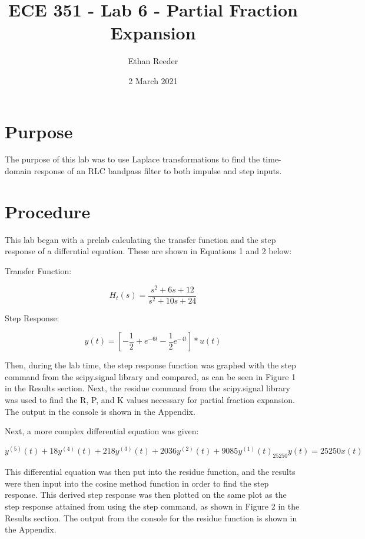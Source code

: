 \documentclass[12pt]{article}
\title{ECE 351 - Lab 6 - Partial Fraction Expansion}
\author{Ethan Reeder}
\date{2 March 2021}
\begin{document}
\lstset{language=Python}

\maketitle

\newpage

\tableofcontents

\newpage

\section{Purpose}

The purpose of this lab was to use Laplace transformations to find the time-domain response of an RLC bandpass filter to both impulse and step inputs.

\section{Procedure}

This lab began with a prelab calculating the transfer function and the step response of a differntial equation. These are shown in Equations 1 and 2 below:

Transfer Function:

\begin{equation}
    H_{t}(s) = \frac{s^2+6s+12}{s^2+10s+24}
\end{equation}

Step Response:

\begin{equation}
    y(t) = [-\frac{1}{2} + e^{-6t} - \frac{1}{2} e^{-4t}] * u(t)
\end{equation}

Then, during the lab time, the step response function was graphed with the step command from the scipy.signal library and compared, as can be seen in Figure 1 in the Results section. Next, the residue command from the scipy.signal library was used to find the R, P, and K values necessary for partial fraction expansion. The output in the console is shown in the Appendix.

Next, a more complex differential equation was given:

\begin{equation}
    y^{(5)}(t) + 18y^{(4)}(t) + 218y^{(3)}(t) + 2036y^{(2)}(t) + 9085y^{(1)}(t)_25250y(t) = 25250x(t)
\end{equation}

This differential equation was then put into the residue function, and the results were then input into the cosine method function in order to find the step response. This derived step response was then plotted on the same plot as the step response attained from using the step command, as shown in Figure 2 in the Results section. The output from the console for the residue function is shown in the Appendix.
\end{document}
